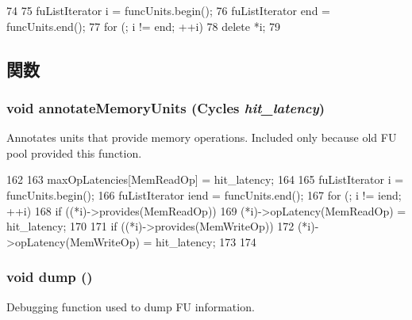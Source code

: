\begin{DoxyCode}
74 {
75     fuListIterator i = funcUnits.begin();
76     fuListIterator end = funcUnits.end();
77     for (; i != end; ++i)
78         delete *i;
79 }
\end{DoxyCode}


\subsection{関数}
\hypertarget{classFUPool_a59e607411e1d22642856849eff50ea12}{
\subsubsection[{annotateMemoryUnits}]{\setlength{\rightskip}{0pt plus 5cm}void annotateMemoryUnits ({\bf Cycles} {\em hit\_\-latency})}}
\label{classFUPool_a59e607411e1d22642856849eff50ea12}
Annotates units that provide memory operations. Included only because old FU pool provided this function. 


\begin{DoxyCode}
162 {
163     maxOpLatencies[MemReadOp] = hit_latency;
164 
165     fuListIterator i = funcUnits.begin();
166     fuListIterator iend = funcUnits.end();
167     for (; i != iend; ++i) {
168         if ((*i)->provides(MemReadOp))
169             (*i)->opLatency(MemReadOp) = hit_latency;
170 
171         if ((*i)->provides(MemWriteOp))
172             (*i)->opLatency(MemWriteOp) = hit_latency;
173     }
174 }
\end{DoxyCode}
\hypertarget{classFUPool_accd2600060dbaee3a3b41aed4034c63c}{
\subsubsection[{dump}]{\setlength{\rightskip}{0pt plus 5cm}void dump ()}}
\label{classFUPool_accd2600060dbaee3a3b41aed4034c63c}
Debugging function used to dump FU information. 


